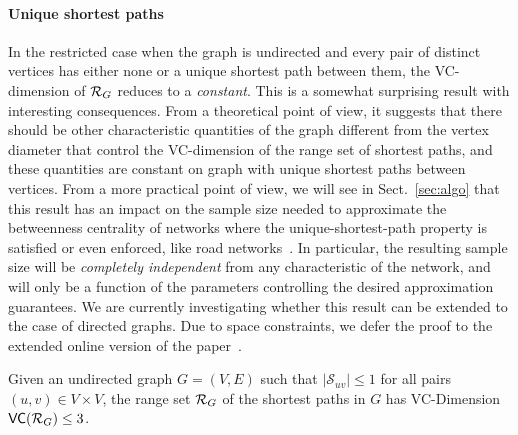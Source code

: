 \paragraph{Unique shortest paths}\label{sec:rangeunique}
In the restricted case when the graph is undirected and
every pair of distinct vertices has either none or a unique shortest path
between them, the VC-dimension of $\mathcal{R}_G$ reduces %
to a \emph{constant}. This is a
somewhat surprising result with interesting consequences. From a theoretical
point of view, it suggests that there should be other characteristic
quantities of the graph different from the vertex diameter that control the
VC-dimension of the range set of shortest paths, and these quantities are
constant on graph with unique shortest paths between vertices. From a more
practical point of view, we will see in Sect.~\ref{sec:algo} that this result has an
impact on the sample size needed to approximate %
the betweenness centrality of
networks where the unique-shortest-path property is satisfied or even enforced,
like road networks~\citep{GeisbergerSS08}. In particular, the resulting sample
size will be \emph{completely independent} from any characteristic of the
network, and will only be a function of the parameters controlling the desired
approximation guarantees. We are currently investigating whether this result can
be extended to the case of directed graphs.
\ifproof
\else
Due to space constraints, we defer the proof to the extended online version of
the paper~\citep{Anonymous13}.
\fi

\begin{lemma}\label{lem:vcdimuppboundunique}
  Given an undirected
  graph $G=(V,E)$ such that $|\mathcal{S}_{uv}|\le1$ for all
  pairs $(u,v)\in V\times V$, the range set $\mathcal{R}_G$ of the
  shortest paths in $G$ has VC-Dimension $\mathsf{VC}(\mathcal{R}_G)\le3$.
\end{lemma}

